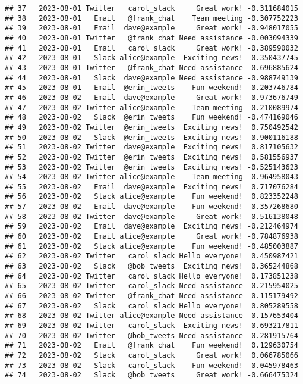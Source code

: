 \documentclass[
]{article}
\begin{document}
\begin{verbatim}
## 37   2023-08-01 Twitter   carol_slack     Great work! -0.311684015
## 38   2023-08-01   Email   @frank_chat    Team meeting -0.307752223
## 39   2023-08-01   Email  dave@example     Great work! -0.948017055
## 40   2023-08-01 Twitter   @frank_chat Need assistance -0.003094339
## 41   2023-08-01   Email   carol_slack     Great work! -0.389590032
## 42   2023-08-01   Slack alice@example  Exciting news!  0.350437745
## 43   2023-08-01 Twitter   @frank_chat Need assistance -0.696885624
## 44   2023-08-01   Slack  dave@example Need assistance -0.988749139
## 45   2023-08-01   Email  @erin_tweets    Fun weekend!  0.203746784
## 46   2023-08-02   Email  dave@example     Great work!  0.973676749
## 47   2023-08-02 Twitter alice@example    Team meeting  0.210089974
## 48   2023-08-02   Slack  @erin_tweets    Fun weekend! -0.474169046
## 49   2023-08-02 Twitter  @erin_tweets  Exciting news!  0.750492542
## 50   2023-08-02   Slack  @erin_tweets  Exciting news!  0.900116188
## 51   2023-08-02 Twitter  dave@example  Exciting news!  0.817105632
## 52   2023-08-02 Twitter  @erin_tweets  Exciting news!  0.581556937
## 53   2023-08-02 Twitter  @erin_tweets  Exciting news! -0.525143623
## 54   2023-08-02 Twitter alice@example    Team meeting  0.964958043
## 55   2023-08-02   Email  dave@example  Exciting news!  0.717076284
## 56   2023-08-02   Slack alice@example    Fun weekend!  0.823352248
## 57   2023-08-02   Email  dave@example    Fun weekend! -0.357268680
## 58   2023-08-02 Twitter  dave@example     Great work!  0.516138048
## 59   2023-08-02   Email  dave@example  Exciting news! -0.212464974
## 60   2023-08-02   Email alice@example     Great work! -0.784876938
## 61   2023-08-02   Slack alice@example    Fun weekend! -0.485003887
## 62   2023-08-02 Twitter   carol_slack Hello everyone!  0.450987421
## 63   2023-08-02   Slack   @bob_tweets  Exciting news!  0.365244868
## 64   2023-08-02 Twitter   carol_slack Hello everyone!  0.173851238
## 65   2023-08-02 Twitter   carol_slack Need assistance  0.215954025
## 66   2023-08-02 Twitter   @frank_chat Need assistance -0.115179492
## 67   2023-08-02   Slack   carol_slack Hello everyone!  0.805289558
## 68   2023-08-02 Twitter alice@example Need assistance  0.157653404
## 69   2023-08-02 Twitter   carol_slack  Exciting news! -0.693217811
## 70   2023-08-02 Twitter   @bob_tweets Need assistance -0.281915764
## 71   2023-08-02   Email   @frank_chat    Fun weekend!  0.129630754
## 72   2023-08-02   Slack   carol_slack     Great work!  0.066785066
## 73   2023-08-02   Slack   carol_slack    Fun weekend!  0.045978463
## 74   2023-08-02   Slack   @bob_tweets     Great work! -0.666475324

\end{verbatim}
\end{document}
